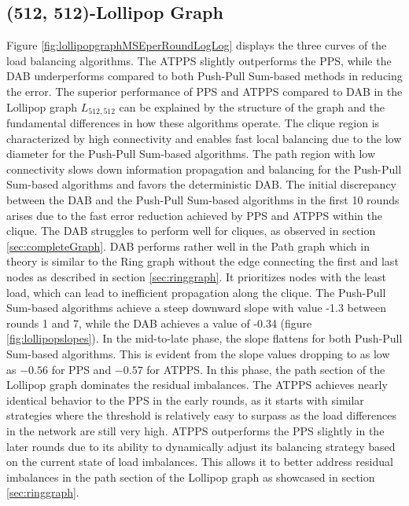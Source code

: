 \subsection{(512, 512)-Lollipop Graph}
Figure \ref{fig:lollipopgraphMSEperRoundLogLog} displays the three curves of the load balancing algorithms. The ATPPS slightly outperforms the PPS, while the DAB underperforms compared to both Push-Pull Sum-based methods in reducing the error. The superior performance of PPS and ATPPS compared to DAB in the Lollipop graph $L_{512,512}$ can be explained by the structure of the graph and the fundamental differences in how these algorithms operate. The clique region is characterized by high connectivity and enables fast local balancing due to the low diameter for the Push-Pull Sum-based algorithms. The path region with low connectivity slows down information propagation and balancing for the Push-Pull Sum-based algorithms and favors the deterministic DAB. The initial discrepancy between the DAB and the Push-Pull Sum-based algorithms in the first 10 rounds arises due to the fast error reduction achieved by PPS and ATPPS within the clique. The DAB struggles to perform well for cliques, as observed in section \ref{sec:completeGraph}. DAB performs rather well in the Path graph which in theory is similar to the Ring graph without the edge connecting the first and last nodes as described in section \ref{sec:ringgraph}. It prioritizes nodes with the least load, which can lead to inefficient propagation along the clique. The Push-Pull Sum-based algorithms achieve a steep downward slope with value -1.3 between rounds 1 and 7, while the DAB achieves a value of -0.34 (figure \ref{fig:lollipopslopes}). In the mid-to-late phase, the slope flattens for both Push-Pull Sum-based algorithms. This is evident from the slope values dropping to as low as $-0.56$ for PPS and $-0.57$ for ATPPS. In this phase, the path section of the Lollipop graph dominates the residual imbalances. The ATPPS achieves nearly identical behavior to the PPS in the early rounds, as it starts with similar strategies where the threshold is relatively easy to surpass as the load differences in the network are still very high. ATPPS outperforms the PPS slightly in the later rounds due to its ability to dynamically adjust its balancing strategy based on the current state of load imbalances. This allows it to better address residual imbalances in the path section of the Lollipop graph as showcased in section \ref{sec:ringgraph}.

